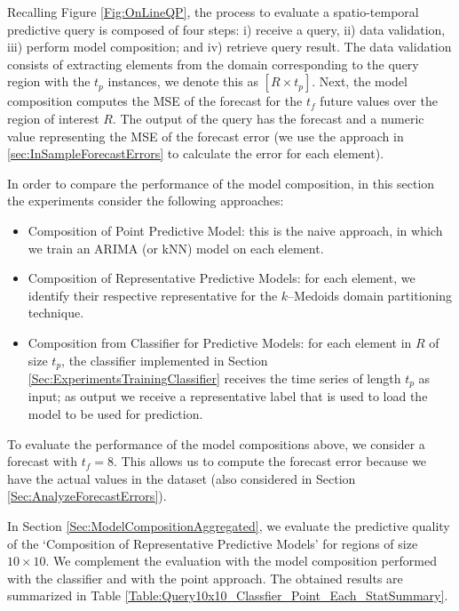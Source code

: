Recalling Figure \ref{Fig:OnLineQP}, the process to evaluate a spatio-temporal predictive query is composed of four steps: i) receive a query, ii) data validation, iii) perform model composition; and iv) retrieve query result. The data validation consists of extracting elements from the domain corresponding to the query region with the $t_p$ instances, we denote this as $[R \times t_{p}]$. Next, the model composition computes the MSE of the forecast for the $t_{f}$ future values over the region of interest $R$. The output of the query has the forecast and a numeric value representing the MSE of the forecast error (we use the approach in \ref{sec:InSampleForecastErrors} to calculate the error for each element). 

In order to compare the performance of the model composition, in this section the experiments consider the following approaches:
\begin{itemize}
	\item Composition of Point Predictive Model: this is the naive approach, in which we train an ARIMA (or kNN) model on each element.
	\item Composition of Representative Predictive Models: for each element, we identify their respective representative for the $k$--Medoids domain partitioning technique.
	\item Composition from Classifier for Predictive Models: for each element in $R$ of size $t_{p}$, the classifier implemented in Section \ref{Sec:ExperimentsTrainingClassifier} receives the time series of length $t_{p}$ as input; as output we receive a representative label that is used to load the model to be used for prediction.
\end{itemize}

To evaluate the performance of the model compositions above, we consider a forecast with $t_{f} = 8$. This allows us to compute the forecast error because we have the actual values in the dataset (also considered in Section \ref{Sec:AnalyzeForecastErrors}). 

In Section \ref{Sec:ModelCompositionAggregated}, we evaluate the predictive quality of the `Composition of Representative Predictive Models' for regions of size $10 \times 10$. We complement the evaluation with the model composition performed with the classifier and with the point approach. The obtained results are summarized in Table \ref{Table:Query10x10_Classfier_Point_Each_StatSummary}.


